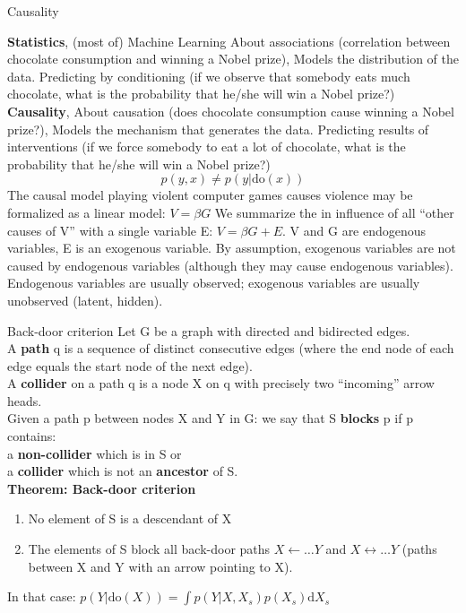\documentclass[a4paper,landscape]{amsmlaj}
\makeatletter
\renewcommand{\section}{\@startsection{section}{1}{0mm}
	{-0ex plus -.1ex minus -.5ex}
	{0.1ex plus .7ex}
	{\normalfont\large\bfseries}}
\renewcommand{\subsection}{\@startsection{subsection}{2}{0mm}
	{-1ex plus -.5ex minus -.2ex}
	{0.1ex plus .2ex}
	{\normalfont\normalsize\bfseries}}
\makeatother
\begin{document}
\begin{multicols*}{3}
\section{Causality}
\begin{scriptsize}
\textbf{Statistics}, (most of) Machine Learning About associations (correlation
between chocolate consumption and winning a Nobel prize), Models the
distribution of the data. Predicting by conditioning (if we observe that
somebody eats much chocolate, what is the probability that he/she will win a
Nobel prize?)
\textbf{Causality}, About causation (does chocolate consumption cause winning a
Nobel prize?), Models the mechanism that generates the data. Predicting results
of interventions (if we force somebody to eat a lot of chocolate, what is the
probability that he/she will win a Nobel prize?)
$$p(y,x) \neq p(y|\mathrm{do}(x))$$
The causal model playing violent computer games causes violence may be
formalized as a linear model: $V = \beta G$ We summarize the in influence of all
``other causes of V'' with a single variable E: $V = \beta G +E$. V and G are
endogenous variables, E is an exogenous variable. By assumption, exogenous
variables are not caused by endogenous variables (although they may cause
endogenous variables). Endogenous variables are usually observed; exogenous
variables are usually unobserved (latent, hidden).
\end{scriptsize}

\subsection{Back-door criterion}
Let G be a graph with directed and bidirected  edges. \\
A \textbf{path} q is a sequence of distinct consecutive edges (where the end
node of each edge equals the start node of the next edge). \\
A \textbf{collider} on a path q is a node X on q with precisely two ``incoming''
arrow heads.\\
Given a path p between nodes X and Y in G: we say that S \textbf{blocks} p if p
contains: \\
a \textbf{non-collider} which is in S or \\
a \textbf{collider} which is not an \textbf{ancestor} of S. \\
\textbf{Theorem: Back-door criterion}
\begin{enumerate}
	\item No element of S is a descendant of X
	\item The elements of S block all back-door paths $X \leftarrow \ldots Y$ and
		$X \leftrightarrow \ldots Y$ (paths between X and Y with an arrow pointing to X).
\end{enumerate}
In that case:
$p(Y|\mathrm{do}(X)) = \int p(Y|X,X_s)p(X_s) \mathrm{d}X_s$


\end{multicols*}
\end{document}
